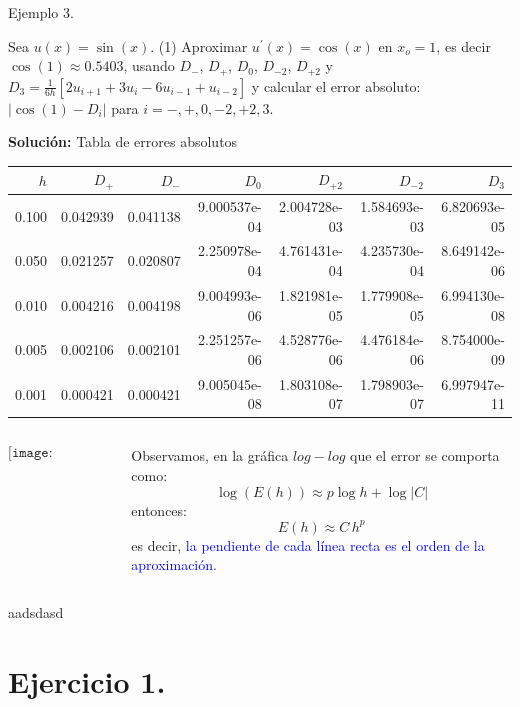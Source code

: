 \documentclass{beamer}
\begin{document}
\begin{frame}

\begin{block}{Ejemplo 3.}
{\scriptsize 
Sea $u(x) = \sin(x)$. (1) Aproximar $u^{\prime}(x) = \cos(x)$ en $x_o = 1$, es decir $\cos(1) \approx 0.5403$, 
usando $D_-$, $D_+$, $D_0$, $D_{-2}$, $D_{+2}$ y $D_3  = \frac{1}{6h}[2u_{i+1} + 3u_i - 6u_{i-1} + u_{i-2}]$ 
y calcular el error absoluto: $|\cos(1) - D_i|$ para $i= -, + , 0, -2, +2, 3$.
%

\textbf{Solución:} Tabla de errores absolutos}
{\tiny 
\begin{tabular}{rrrrrrr}
	\toprule
	$h$ &     $D_+$ &     $D_-$ &    $D_0$ &      $D_{+2}$ &   $D_{-2}$ &         $D_3$ \\
	\midrule
	0.100 &  0.042939 &  0.041138 &  9.000537e-04 &  2.004728e-03 &  1.584693e-03 &  6.820693e-05 \\
	0.050 &  0.021257 &  0.020807 &  2.250978e-04 &  4.761431e-04 &  4.235730e-04 &  8.649142e-06 \\
	0.010 &  0.004216 &  0.004198 &  9.004993e-06 &  1.821981e-05 &  1.779908e-05 &  6.994130e-08 \\
	0.005 &  0.002106 &  0.002101 &  2.251257e-06 &  4.528776e-06 &  4.476184e-06 &  8.754000e-09 \\
	0.001 &  0.000421 &  0.000421 &  9.005045e-08 &  1.803108e-07 &  1.798903e-07 &  6.997947e-11 \\
	\bottomrule
\end{tabular}}
%
\begin{columns}
\begin{column}{0.50\textwidth}
$$\texttt{[image: LogLogFDM]}$$
\end{column}
\begin{column}{0.45\textwidth}
{\scriptsize Observamos, en la gráfica $log-log$ que el error se comporta como:
$$\log(E(h)) \approx p \log h + \log|C|$$
entonces: 
$$E(h) \approx C \, h^p$$
es decir, \textcolor{blue}{la pendiente de cada l\'inea recta es el orden de la aproximaci\'on}}.
\end{column}
\end{columns}

aadsdasd

\end{block}

\end{frame}

\section{Ejercicio 1.}
\end{document}
